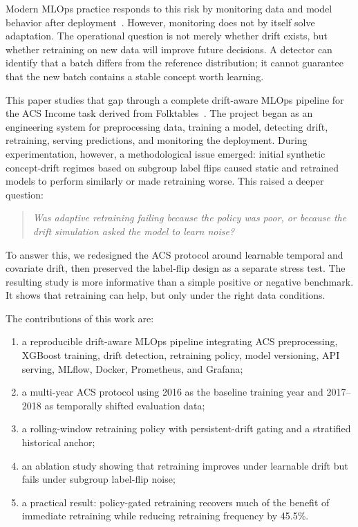 \documentclass[conference]{IEEEtran}
\begin{document}
Modern MLOps practice responds to this risk by monitoring data and model behavior after deployment~\cite{kreuzberger2023mlops,breck2017mltest}. However, monitoring does not by itself solve adaptation. The operational question is not merely whether drift exists, but whether retraining on new data will improve future decisions. A detector can identify that a batch differs from the reference distribution; it cannot guarantee that the new batch contains a stable concept worth learning.

This paper studies that gap through a complete drift-aware MLOps pipeline for the ACS Income task derived from Folktables~\cite{ding2021retiring}. The project began as an engineering system for preprocessing data, training a model, detecting drift, retraining, serving predictions, and monitoring the deployment. During experimentation, however, a methodological issue emerged: initial synthetic concept-drift regimes based on subgroup label flips caused static and retrained models to perform similarly or made retraining worse. This raised a deeper question:

\begin{quote}
\emph{Was adaptive retraining failing because the policy was poor, or because the drift simulation asked the model to learn noise?}
\end{quote}

To answer this, we redesigned the ACS protocol around learnable temporal and covariate drift, then preserved the label-flip design as a separate stress test. The resulting study is more informative than a simple positive or negative benchmark. It shows that retraining can help, but only under the right data conditions.

The contributions of this work are:
\begin{enumerate}[leftmargin=*]
    \item a reproducible drift-aware MLOps pipeline integrating ACS preprocessing, XGBoost training, drift detection, retraining policy, model versioning, API serving, MLflow, Docker, Prometheus, and Grafana;
    \item a multi-year ACS protocol using 2016 as the baseline training year and 2017--2018 as temporally shifted evaluation data;
    \item a rolling-window retraining policy with persistent-drift gating and a stratified historical anchor;
    \item an ablation study showing that retraining improves under learnable drift but fails under subgroup label-flip noise;
    \item a practical result: policy-gated retraining recovers much of the benefit of immediate retraining while reducing retraining frequency by 45.5\%.
\end{enumerate}
\end{document}

